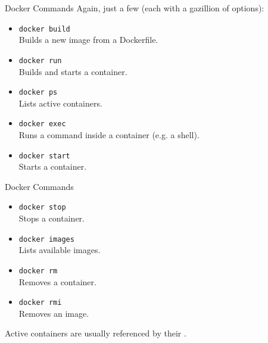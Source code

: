 \begin{frame}{Docker Commands}
Again, just a few (each with a gazillion of options):
\begin{itemize}
  \item \texttt{docker build}\\Builds a new image from a Dockerfile.
  \item \texttt{docker run}\\Builds and starts a container.
  \item \texttt{docker ps}\\Lists active containers.
  \item \texttt{docker exec}\\Runs a command inside a container (e.g. a shell).
  \item \texttt{docker start}\\Starts a container.
\end{itemize}
\end{frame}
\begin{frame}{Docker Commands}
\begin{itemize}
  \item \texttt{docker stop}\\Stops a container.
  \item \texttt{docker images}\\Lists available images.
  \item \texttt{docker rm}\\Removes a container.
  \item \texttt{docker rmi}\\Removes an image.
\end{itemize}
Active containers are usually referenced by their .
\end{frame}
